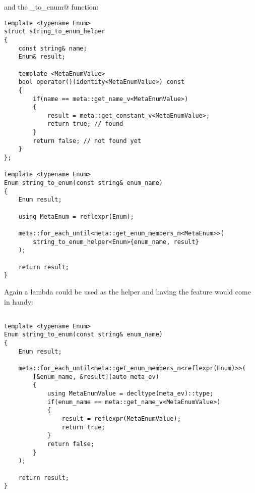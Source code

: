 and the \verb@string_to_enum@ function:

\begin{verbatim}
template <typename Enum>
struct string_to_enum_helper
{
	const string& name;
	Enum& result;

	template <MetaEnumValue>
	bool operator()(identity<MetaEnumValue>) const
	{
		if(name == meta::get_name_v<MetaEnumValue>)
		{
			result = meta::get_constant_v<MetaEnumValue>;
			return true; // found
		}
		return false; // not found yet
	}
};

template <typename Enum>
Enum string_to_enum(const string& enum_name)
{
	Enum result;

	using MetaEnum = reflexpr(Enum);

	meta::for_each_until<meta::get_enum_members_m<MetaEnum>>(
		string_to_enum_helper<Enum>{enum_name, result}
	);

	return result;
}
\end{verbatim}

Again a lambda could be used as the helper and having the 
feature would come in handy:

\begin{verbatim}

template <typename Enum>
Enum string_to_enum(const string& enum_name)
{
	Enum result;

	meta::for_each_until<meta::get_enum_members_m<reflexpr(Enum)>>(
		[&enum_name, &result](auto meta_ev)
		{
			using MetaEnumValue = decltype(meta_ev)::type;
			if(enum_name == meta::get_name_v<MetaEnumValue>)
			{
				result = reflexpr(MetaEnumValue);
				return true;
			}
			return false;
		}
	);

	return result;
}
\end{verbatim}

